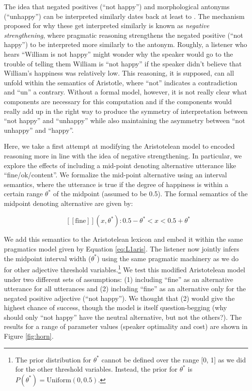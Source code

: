 \documentclass[floatsintext,doc]{apa6}
\let\rmarkdownfootnote\footnote%
\def\footnote{\protect\rmarkdownfootnote}
\begin{document}
The idea that negated positives (``not happy'') and morphological antonyms (``unhappy'') can be interpreted similarly dates back at least to . 
The mechanism proposed for why these get interpreted similarly is known as \emph{negative strengthening}, where pragmatic reasoning strengthens the negated positive (``not happy'') to be interpreted more similarly to the antonym.
Roughly, a listener who hears ``William is not happy'' might wonder why the speaker would go to the trouble of telling them William is ``not happy'' if the speaker didn’t believe that William’s happiness was relatively low.
This reasoning, it is supposed, can all unfold within the semantics of Aristotle, where ``not'' indicates a contradiction and ``un'' a contrary. 
Without a formal model, however, it is not really clear what components  are necessary for this computation and if the components would really add up in the right way to produce the symmetry of interpretation between ``not happy'' and ``unhappy'' while also maintaining the asymmetry between ``not unhappy'' and ``happy''.

Here, we take a first attempt at modifying the Aristotelean model to encoded reasoning more in line with the idea of negative strengthening. 
In particular, we explore the effects of including a mid-point denoting alternative utterance like ``fine/ok/content''. 
We formalize the mid-point alternative using an interval semantics, where the utterance is true if the degree of happiness is within a certain range $\theta^*$ of the midpoint (assumed to be 0.5). The formal semantics of the midpoint denoting alternative are given by: 

\begin{equation}
\mbox{ $[\![\text{fine}]\!]$}(x, \theta^*): 0.5-  \theta^* < x < 0.5  + \theta^* \label{sem:fine}
\end{equation} 

We add this semantics to the Aristotelean lexicon and embed it within the same pragmatics model given by Equation \ref{eq:L1aris}.
The listener now jointly infers the midpoint interval width ($\theta^*$) using the same pragmatic machinery as we do for other adjective threshold variables.\footnote{The prior distribution for $\theta^*$ cannot be defined over the range [0, 1] as we did for the other threshold variables. Instead, the prior for $\theta^*$ is $P(\theta^*) = \text{Uniform}(0, 0.5)$.}
We test this modified Aristotelean model under two different sets of assumptions: (1) including ``fine'' as an alternative utterance for all utterances and (2) including  ``fine''  as an alternative only for the negated positive adjective (“not happy”). 
We thought that (2) would give the highest chance of success, though the model is itself
question-begging (why should only ``not happy'' have the neutral alternative, but not the others?).  
The results for a range of parameter values (speaker optimality and cost) are shown in Figure \ref{fig:horn}. 
\end{document}
